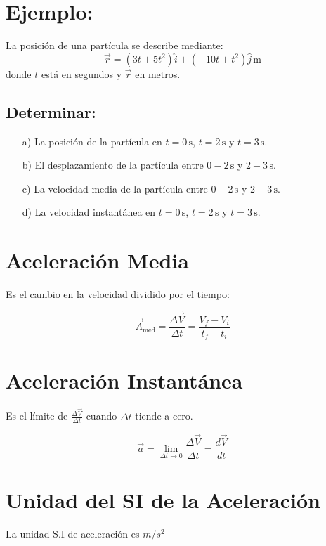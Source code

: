\section{Ejemplo:}
La posición de una partícula se describe mediante:
\[
\vec{r} = (3t + 5t^2) \hat{i} + (-10t + t^2) \hat{j} \, \text{m}
\]
donde $t$ está en segundos y $\vec{r}$ en metros.

\subsection*{Determinar:}
\begin{enumerate}
    \item[a)] La posición de la partícula en $t = 0 \, \text{s}$, $t = 2 \, \text{s}$ y $t = 3 \, \text{s}$.
    \item[b)] El desplazamiento de la partícula entre $0 - 2 \, \text{s}$ y $2 - 3 \, \text{s}$.
    \item[c)] La velocidad media de la partícula entre $0 - 2 \, \text{s}$ y $2 - 3 \, \text{s}$.
    \item[d)] La velocidad instantánea en $t = 0 \, \text{s}$, $t = 2 \, \text{s}$ y $t = 3 \, \text{s}$.
\end{enumerate}

\section{Aceleraci\'on Media}
Es el cambio en la velocidad dividido por el tiempo:

\begin{equation}
\vec{A}_{\text{med}} = \frac{\Delta \vec{V}}{\Delta t} = \frac{V_f - V_i}{t_f - t_i}
\end{equation}

\section{Aceleraci\'on Instant\'anea}
Es el l\'imite de $\frac{\Delta \vec{V}}{\Delta t}$ cuando $\Delta t$ tiende a cero.

\begin{equation}
\vec{a} = \lim\limits_{\Delta t \to 0} \frac{\Delta \vec{V}}{\Delta t} = \frac{d \vec{V}}{d t}
\end{equation}

\section{Unidad del SI de la Aceleraci\'on}
La unidad S.I de aceleraci\'on es $m/s^2$

